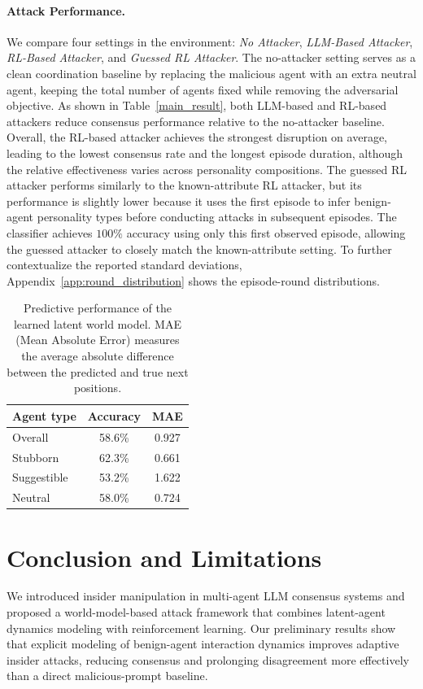 \documentclass{article}
\theoremstyle{plain}
\theoremstyle{definition}
\theoremstyle{remark}
\begin{document}
\vspace{-1ex}
\paragraph{Attack Performance.}
We compare four settings in the environment: \emph{No Attacker}, \emph{LLM-Based Attacker}, \emph{RL-Based Attacker}, and \emph{Guessed RL Attacker}. The no-attacker setting serves as a clean coordination baseline by replacing the malicious agent with an extra neutral agent, keeping the total number of agents fixed while removing the adversarial objective. As shown in Table~\ref{main_result}, both LLM-based and RL-based attackers reduce consensus performance relative to the no-attacker baseline. Overall, the RL-based attacker achieves the strongest disruption on average, leading to the lowest consensus rate and the longest episode duration, although the relative effectiveness varies across personality compositions. The guessed RL attacker performs similarly to the known-attribute RL attacker, but its performance is slightly lower because it uses the first episode to infer benign-agent personality types before conducting attacks in subsequent episodes. The classifier achieves \(100\%\) accuracy using only this first observed episode, allowing the guessed attacker to closely match the known-attribute setting. To further contextualize the reported standard deviations, Appendix~\ref{app:round_distribution} shows the episode-round distributions.

\begin{table}[h]
\centering
\small
\begin{tabular}{lcc}
\toprule
Agent type & Accuracy & MAE \\
\midrule
Overall & 58.6\% & 0.927 \\
Stubborn & 62.3\% & 0.661 \\
Suggestible & 53.2\% & 1.622 \\
Neutral & 58.0\% & 0.724 \\
\bottomrule
\end{tabular}
\caption{Predictive performance of the learned latent world model. MAE (Mean Absolute Error) measures the average absolute difference between the predicted and true next positions.}
\label{tab:wm_results}
\end{table}
\vspace{-4ex}
\section{Conclusion and Limitations}
We introduced insider manipulation in multi-agent LLM consensus systems and proposed a world-model-based attack framework that combines latent-agent dynamics modeling with reinforcement learning. Our preliminary results show that explicit modeling of benign-agent interaction dynamics improves adaptive insider attacks, reducing consensus and prolonging disagreement more effectively than a direct malicious-prompt baseline.
\end{document}
